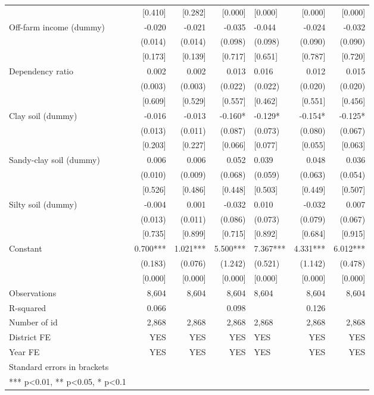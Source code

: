 \documentclass[
]{article}
\begin{document}
\begin{ThreePartTable}
\begin{longtable}[t]{lrrrlrr}
 & {}[0.410] & {}[0.282] & {}[0.000] & {}[0.000] & {}[0.000] & {}[0.000]\\
Off-farm income (dummy) & -0.020 & -0.021 & -0.035 & -0.044 & -0.024 & -0.032\\
 & (0.014) & (0.014) & (0.098) & (0.098) & (0.090) & (0.090)\\
 & {}[0.173] & {}[0.139] & {}[0.717] & {}[0.651] & {}[0.787] & {}[0.720]\\
Dependency ratio & 0.002 & 0.002 & 0.013 & 0.016 & 0.012 & 0.015\\
 & (0.003) & (0.003) & (0.022) & (0.022) & (0.020) & (0.020)\\
 & {}[0.609] & {}[0.529] & {}[0.557] & {}[0.462] & {}[0.551] & {}[0.456]\\
Clay soil (dummy) & -0.016 & -0.013 & -0.160* & -0.129* & -0.154* & -0.125*\\
 & (0.013) & (0.011) & (0.087) & (0.073) & (0.080) & (0.067)\\
 & {}[0.203] & {}[0.227] & {}[0.066] & {}[0.077] & {}[0.055] & {}[0.063]\\
Sandy-clay soil (dummy) & 0.006 & 0.006 & 0.052 & 0.039 & 0.048 & 0.036\\
 & (0.010) & (0.009) & (0.068) & (0.059) & (0.063) & (0.054)\\
 & {}[0.526] & {}[0.486] & {}[0.448] & {}[0.503] & {}[0.449] & {}[0.507]\\
Silty soil (dummy) & -0.004 & 0.001 & -0.032 & 0.010 & -0.032 & 0.007\\
 & (0.013) & (0.011) & (0.086) & (0.073) & (0.079) & (0.067)\\
 & {}[0.735] & {}[0.899] & {}[0.715] & {}[0.892] & {}[0.684] & {}[0.915]\\
Constant & 0.700*** & 1.021*** & 5.500*** & 7.367*** & 4.331*** & 6.012***\\
 & (0.183) & (0.076) & (1.242) & (0.521) & (1.142) & (0.478)\\
 & {}[0.000] & {}[0.000] & {}[0.000] & {}[0.000] & {}[0.000] & {}[0.000]\\
Observations & 8,604 & 8,604 & 8,604 & 8,604 & 8,604 & 8,604\\
R-squared & 0.066 &  & 0.098 &  & 0.126 & \\
Number of id & 2,868 & 2,868 & 2,868 & 2,868 & 2,868 & 2,868\\
District FE & YES & YES & YES & YES & YES & YES\\
Year FE & YES & YES & YES & YES & YES & YES\\
Standard errors in brackets &  &  &  &  &  & \\
*** p<0.01, ** p<0.05, * p<0.1 &  &  &  &  &  & \\*
\end{longtable}
\end{ThreePartTable}
\endgroup{}
\newpage
\end{document}
